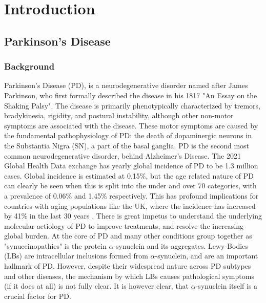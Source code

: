 \documentclass{article}
\begin{document}
\section{Introduction}
\subsection{Parkinson's Disease}
\subsubsection{Background}  
Parkinson's Disease (PD), is a neurodegenerative disorder named after James Parkinson, who first formally described the disease in his 1817 "An Essay on the Shaking Palsy"\cite{Parkinson2002AnPalsy}. The disease is primarily phenotypically characterized by tremors, bradykinesia, rigidity, and postural instability, although other non-motor symptoms are associated with the disease. These motor symptoms are caused by the fundamental pathophysiology of PD: the death of dopaminergic neurons in the Substantia Nigra (SN), a part of the basal ganglia. PD is the second most common neurodegenerative disorder, behind Alzheimer's Disease. The 2021 Global Health Data exchange\cite{Ferrari2024Global2021} has yearly global incidence of PD to be 1.3 million cases. Global incidence is estimated at 0.15\%, but the age related nature of PD can clearly be seen when this is split into the under and over 70 categories, with a prevalence of 0.06\% and 1.45\% respectively. 
This has profound implications for countries with aging populations like the UK, where the incidence has increased by 41\% in the last 30 years \cite{Ferrari2024Global2021}. There is great impetus to understand the underlying molecular aetiology of PD to improve treatments, and resolve the increasing global burden.
At the core of PD and many other conditions group together as "synuceinopathies" is the protein $\alpha$-synuclein and its aggregates. Lewy-Bodies (LBs) are intracellular inclusions formed from $\alpha$-synuclein\cite{Spillantini1997-SynucleinBodies}, and are an important hallmark of PD. However, despite their widespread nature across PD subtypes and other diseases, the mechanism by which LBs causes pathological symptoms (if it does at all) is not fully clear\cite{Riederer2023LewyDisease}. It is however clear, that $\alpha$-synuclein itself is a crucial factor for PD.
\end{document}
